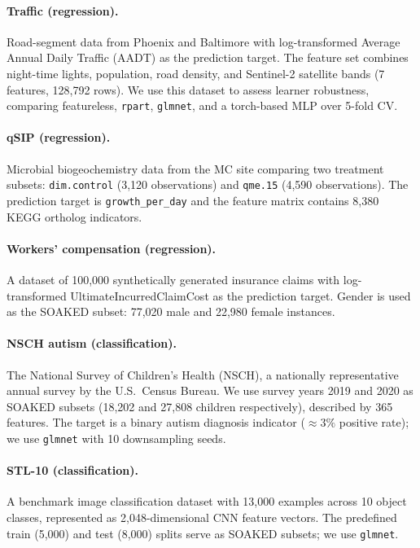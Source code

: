 \documentclass{article}
\begin{document}
\paragraph{Traffic (regression).}
Road-segment data from Phoenix and Baltimore with log-transformed Average Annual Daily Traffic (AADT) as the prediction target.
The feature set combines night-time lights, population, road density, and Sentinel-2 satellite bands (7 features, 128,792 rows).
We use this dataset to assess learner robustness, comparing featureless, \texttt{rpart}, \texttt{glmnet}, and a torch-based MLP over 5-fold CV.

\paragraph{qSIP (regression).}
Microbial biogeochemistry data from the MC site comparing two treatment subsets: \texttt{dim.control} (3,120 observations) and \texttt{qme.15} (4,590 observations).
The prediction target is \texttt{growth\_per\_day} and the feature matrix contains 8,380 KEGG ortholog indicators.

\paragraph{Workers' compensation (regression).}
A dataset of 100,000 synthetically generated insurance claims \citep{Ali2020} with log-transformed UltimateIncurredClaimCost as the prediction target.
Gender is used as the SOAKED subset: 77,020 male and 22,980 female instances.

\paragraph{NSCH autism (classification).}
The National Survey of Children's Health (NSCH), a nationally representative annual survey by the U.S.\ Census Bureau.
We use survey years 2019 and 2020 as SOAKED subsets (18,202 and 27,808 children respectively), described by 365 features.
The target is a binary autism diagnosis indicator ($\approx3\%$ positive rate); we use \texttt{glmnet} with 10 downsampling seeds.

\paragraph{STL-10 (classification).}
A benchmark image classification dataset \citep{coates2011stl10} with 13,000 examples across 10 object classes, represented as 2,048-dimensional CNN feature vectors.
The predefined train (5,000) and test (8,000) splits serve as SOAKED subsets; we use \texttt{glmnet}.
\end{document}
